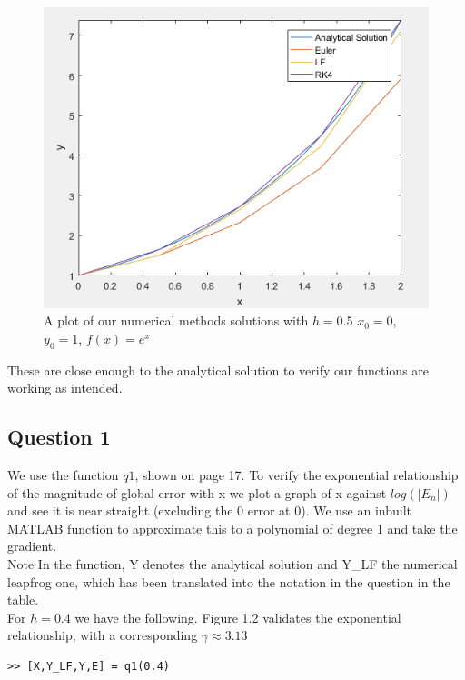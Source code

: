 \documentclass[10pt,a4paper]{report}
\begin{document}
\begin{figure}[H]
\centering
\includegraphics[scale=0.8]{test12}
\caption{A plot of our numerical methods solutions with $h=0.5$ $x_0=0$, $y_0=1$, $f(x)=e^x$}
\end{figure}

These are close enough to the analytical solution to verify our functions are working as intended.

\subsection*{Question 1}
We use the function $q1$, shown on page 17. To verify the exponential relationship of the magnitude of global error with x we plot a graph of x against $log(|E_n|)$ and see it is near straight (excluding the 0 error at 0). We use an inbuilt MATLAB function to approximate this to a polynomial of degree 1 and take the gradient. \\

Note In the function, Y denotes the analytical solution and Y\_LF the numerical leapfrog one, which has been translated into the notation in the question in the table.\\

For $h=0.4$ we have the following. Figure 1.2 validates the exponential relationship, with a corresponding $\gamma\approx 3.13$

\begin{verbatim}
>> [X,Y_LF,Y,E] = q1(0.4)
\end{verbatim}
\end{document}
